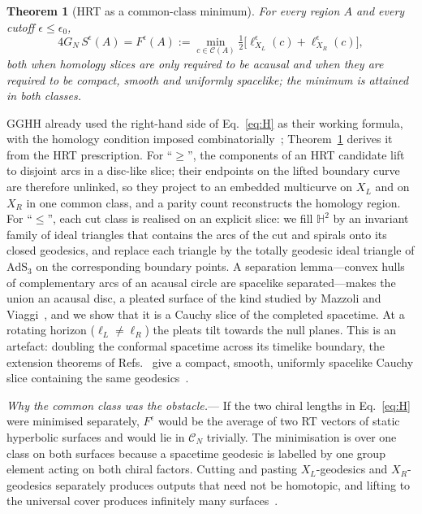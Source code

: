 \documentclass[aps,prl,twocolumn,superscriptaddress,nofootinbib,amsmath,amssymb]{revtex4-2}
\newtheorem{theorem}{Theorem}
\theoremstyle{definition}
\newcommand{\AdS}{\mathrm{AdS}_3}
\newcommand{\Hyp}{\mathbb{H}^2}
\newcommand{\Cut}{\mathcal{C}}
\newcommand{\CN}{\mathcal{C}_N}
\newcommand{\eps}{\epsilon}
\begin{document}
\begin{theorem}[HRT as a common-class minimum]\label{thm:H}
For every region $A$ and every cutoff $\eps\le\eps_0$,
\begin{equation}\label{eq:H}
4G_N\,S^\eps(A)=F^\eps(A):=\min_{c\in\Cut(A)}\tfrac12\big[\ell^\eps_{X_L}(c)+\ell^\eps_{X_R}(c)\big],
\end{equation}
both when homology slices are only required to be acausal and when they are required to be compact, smooth
and uniformly spacelike; the minimum is attained in both classes.
\end{theorem}

GGHH already used the right-hand side of Eq.~\eqref{eq:H} as their working formula, with the homology
condition imposed combinatorially~\cite{GGHH2025}; Theorem~\ref{thm:H} derives it from the HRT prescription.
For ``$\ge$'', the components of an HRT candidate lift to disjoint arcs in a disc-like slice; their endpoints on
the lifted boundary curve are therefore unlinked, so they project to an embedded multicurve on $X_L$ and on $X_R$
in one common class, and a parity count reconstructs the homology region. For ``$\le$'', each cut class is
realised on an explicit slice: we fill $\Hyp$ by an invariant family of ideal triangles that contains the arcs of
the cut and spirals onto its closed geodesics, and replace each triangle by the totally geodesic ideal triangle
of $\AdS$ on the corresponding boundary points. A separation lemma---convex hulls of complementary arcs of an
acausal circle are spacelike separated---makes the union an acausal disc, a pleated surface of the kind studied
by Mazzoli and Viaggi~\cite{MazzoliViaggi2022}, and we show that it is a Cauchy slice of the completed spacetime.
At a rotating horizon ($\ell_L\neq\ell_R$) the pleats tilt towards the null planes. This is an artefact: doubling
the conformal spacetime across its timelike boundary, the extension theorems of
Refs.~\cite{BernalSanchez2006,AkeFloresSanchez2021} give a compact, smooth, uniformly spacelike Cauchy slice
containing the same geodesics~\cite{SM}.

\emph{Why the common class was the obstacle.}---%
If the two chiral lengths in Eq.~\eqref{eq:H} were minimised separately, $F^\eps$ would be the average of two
RT vectors of static hyperbolic surfaces and would lie in $\CN$ trivially. The minimisation is over one class
on both surfaces because a spacetime geodesic is labelled by one group element acting on both chiral factors.
Cutting and pasting $X_L$-geodesics and $X_R$-geodesics separately produces outputs that need not be homotopic,
and lifting to the universal cover produces infinitely many surfaces~\cite{GGHH2025}.
\end{document}
